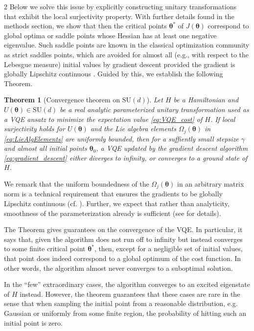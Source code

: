 \documentclass{article}
\renewcommand{\vec}[1]{\ensuremath{\boldsymbol{#1}}}
\newtheorem{theorem}{Theorem}
\begin{document}
\begin{multicols}{2}
Below we solve this issue by explicitly constructing unitary transformations that exhibit the local surjectivity property. With further details found in the methods section, we show that then the critical points $\vec{\theta}^{*}$ of $J(\vec{\theta})$ correspond to global optima or saddle points whose Hessian has at least one negative eigenvalue. Such saddle points are known in the classical optimization community as strict saddles points, which are avoided for almost all (e.g., with respect to the Lebesgue measure) initial values by gradient descent provided the gradient is globally Lipschitz continuous \cite{lee_first-order_2019, pmlr-v49-lee16}. Guided by this, we establish the following Theorem.  

\begin{theorem}[Convergence theorem on \(\mathrm{SU}(d)\)]
    \label{thm:su(d)_convergence}
    Let \(H\) be a Hamiltonian and $U(\vec{\theta})\in\mathrm{SU}(d)$ be a real analytic parameterized unitary transformation used as a VQE ansatz to minimize the expectation value \eqref{eq:VQE_cost} of $H$. If local surjectivity holds for $U(\vec{\theta})$ and the Lie algebra elements $\Omega_j(\vec{\theta})$ in \eqref{eq:LieAlgElements} are uniformly bounded, then for a suffiently small stepsize $\gamma$ and almost all initial points \(\vec{\theta}_0\), a VQE updated by the gradient descent algorithm \eqref{eq:gradient_descent} either diverges to infinity, or converges to a ground state of $H$.
\end{theorem}

We remark that the uniform boundedness of the \(\Omega_j(\vec{\theta})\) in an arbitrary matrix norm is a technical requirement that ensures the gradients to be globally Lipschitz continuous (cf. ).
Further, we expect that rather than analyticity, smoothness of the parameterization already is sufficient (see  for details).

The Theorem gives guarantees on the convergence of the \gls{VQE}. In particular, it says that, given the algorithm does not run off to infinity but instead converges to some finite critical point \(\vec{\theta}^*\), then, except for a negligible set of initial values, that point does indeed correspond to a global optimum of the cost function. In other words, the algorithm almost never converges to a suboptimal solution.

In the ``few'' extraordinary cases, the algorithm converges to an excited eigenstate of \(H\) instead.
However, the theorem guarantees that these cases are rare in the sense that when sampling the initial point from a reasonable distribution, e.g. Gaussian or uniformly from some finite region, the probability of hitting such an initial point is zero.


\end{multicols}
\end{document}
